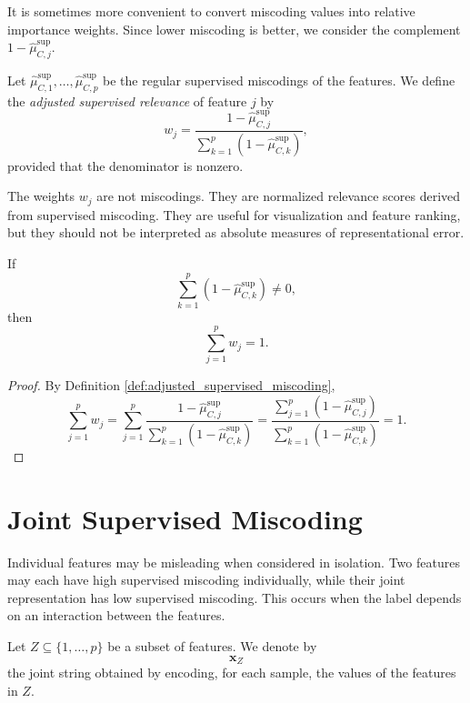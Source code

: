 It is sometimes more convenient to convert miscoding values into relative importance weights. Since lower miscoding is better, we consider the complement \(1-\hat\mu_{C,j}^{\mathrm{sup}}\).

\begin{definition}
\label{def:adjusted_supervised_miscoding}
Let \(\hat\mu_{C,1}^{\mathrm{sup}},\ldots,\hat\mu_{C,p}^{\mathrm{sup}}\) be the regular supervised miscodings of the features. We define the \emph{adjusted supervised relevance} of feature \(j\) by
\[
    w_j
    =
    \frac{
        1-\hat\mu_{C,j}^{\mathrm{sup}}
    }
    {
        \sum_{k=1}^p \left(1-\hat\mu_{C,k}^{\mathrm{sup}}\right)
    },
\]
provided that the denominator is nonzero.
\end{definition}

The weights \(w_j\) are not miscodings. They are normalized relevance scores derived from supervised miscoding. They are useful for visualization and feature ranking, but they should not be interpreted as absolute measures of representational error.

\begin{proposition}
\label{prop:adjusted_weights_sum}
If
\[
    \sum_{k=1}^p \left(1-\hat\mu_{C,k}^{\mathrm{sup}}\right)\neq 0,
\]
then
\[
    \sum_{j=1}^p w_j=1.
\]
\end{proposition}

\begin{proof}
By Definition \ref{def:adjusted_supervised_miscoding},
\[
    \sum_{j=1}^p w_j
    =
    \sum_{j=1}^p
    \frac{
        1-\hat\mu_{C,j}^{\mathrm{sup}}
    }
    {
        \sum_{k=1}^p \left(1-\hat\mu_{C,k}^{\mathrm{sup}}\right)
    }
    =
    \frac{
        \sum_{j=1}^p \left(1-\hat\mu_{C,j}^{\mathrm{sup}}\right)
    }
    {
        \sum_{k=1}^p \left(1-\hat\mu_{C,k}^{\mathrm{sup}}\right)
    }
    =
    1.
\]
\end{proof}

\section{Joint Supervised Miscoding}
\label{sec:joint_supervised_miscoding}

Individual features may be misleading when considered in isolation. Two features may each have high supervised miscoding individually, while their joint representation has low supervised miscoding. This occurs when the label depends on an interaction between the features.

Let \(Z\subseteq\{1,\ldots,p\}\) be a subset of features. We denote by
\[
    \mathbf{x}_Z
\]
the joint string obtained by encoding, for each sample, the values of the features in \(Z\).

